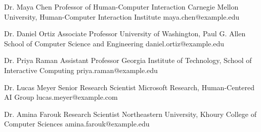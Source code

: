 %
%
%

\begin{referees}
    {Dr. Maya Chen}
    {Professor of Human-Computer Interaction}
    {Carnegie Mellon University, Human-Computer Interaction Institute}
    {maya.chen@example.edu}

    {Dr. Daniel Ortiz}
    {Associate Professor}
    {University of Washington, Paul G. Allen School of Computer Science and Engineering}
    {daniel.ortiz@example.edu}
 
          
    {Dr. Priya Raman}
    {Assistant Professor}
    {Georgia Institute of Technology, School of Interactive Computing}
    {priya.raman@example.edu}


    {Dr. Lucas Meyer}
    {Senior Research Scientist}
    {Microsoft Research, Human-Centered AI Group}
    {lucas.meyer@example.com}

    {Dr. Amina Farouk}
    {Research Scientist}
    {Northeastern University, Khoury College of Computer Sciences}
    {amina.farouk@example.edu}
\end{referees}
